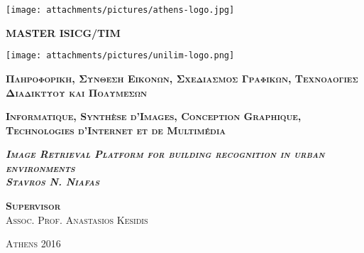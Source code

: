 \documentclass[a4paper,12pt,twoside]{report}
\begin{document}
    \noindent
    \begin{minipage}[c]{0.2\textwidth}    %
        \texttt{[image: attachments/pictures/athens-logo.jpg]}
    \end{minipage}%
    \begin{minipage}[c][2cm]{0.6\textwidth}
        \centering\bfseries\large
        \textsc{\Large MASTER ISICG/TIM }  \vfill
    \end{minipage}%
    \begin{minipage}[c]{0.1\textwidth}
        \texttt{[image: attachments/pictures/unilim-logo.png]}
    \end{minipage}
  

    \begin{center}
        
        \vspace*{1.5cm}

        \textsc{\Large\textbf{ \textgreek{ Πληροφορική, Σύνθεση Εικόνων, Σχεδιασμός Γραφικών, Τεχνολογίες Διαδικτύου και Πολυμέσων} }} \\
        
        \vspace*{0.5cm}
        
        \textsc{\Large\textbf{Informatique, Synthèse d'Images, Conception Graphique, Technologies d’Internet et de Multimédia}} 
    
        \vspace*{4cm}

        \textsc{\LARGE\textbf{\textit{ Image Retrieval Platform for building recognition in urban environments} }} \\
        
        \vspace*{0.5cm}
        \textsc{\large\textbf{ \textit{Stavros N. Niafas}  }} \\
   
        \vspace*{3cm}
        
        \textsc{\large\textbf{Supervisor}}\\ 
        \textsc{\large Assoc. Prof. Anastasios Kesidis
	} 
  
        \vspace*{7cm}
    
        \textsc{\normalsize{Athens 2016}} 
    
    \end{center}

    \thispagestyle{empty}



\thispagestyle{empty}



\tableofcontents
\listoffigures
\listoftables







% 




\end{document}
